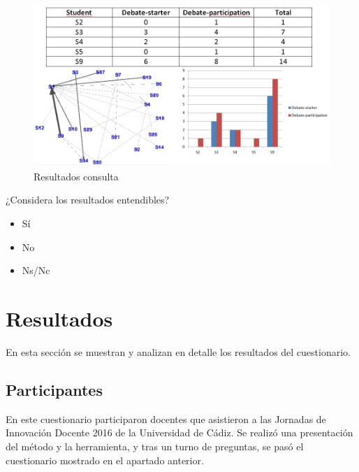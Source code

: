 \begin{figure}[H]
  \begin{center}
    \includegraphics[scale=0.4]{ResultadosConsulta.png}
  \end{center}
  \caption{Resultados consulta}
  \label{fig:ape:resultados:consulta}
\end{figure}

\begin{mdframed}[style=cuestionarioST]
	¿Considera los resultados entendibles?
			\begin{itemize}
				\item Sí
				\item No
				\item Ns/Nc
			\end{itemize}
\end{mdframed}



\newpage

\section{Resultados} \label{apc:eval:metodo:resultados}

En esta sección se muestran y analizan en detalle los resultados del cuestionario. %

\subsection{Participantes}

En este cuestionario participaron docentes que asistieron a las Jornadas de Innovación Docente 2016 de la Universidad de Cádiz. Se realizó una presentación del método y la herramienta, y tras un turno de preguntas, se pasó el cuestionario mostrado en el apartado anterior.

